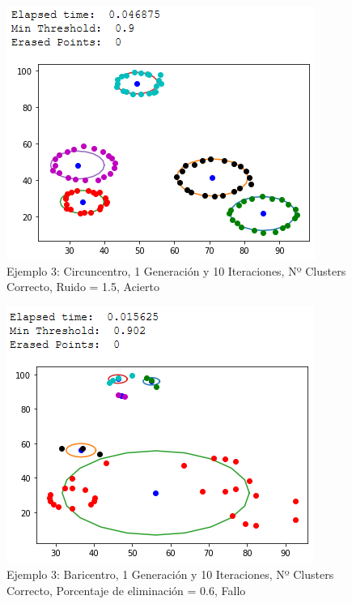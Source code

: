 \documentclass[conference,a4paper]{IEEEtran}
\begin{document}
\begin{figure}[H]
\centering
\includegraphics[scale=0.65]{Experimentacion/Ejemplo3/ej3_c_1_10_lr}
\caption{Ejemplo 3: Circuncentro, 1 Generación y 10 Iteraciones,  Nº Clusters Correcto, Ruido = 1.5, Acierto\\}
\end{figure}

\begin{figure}[H]
\centering
\includegraphics[scale=0.65]{Experimentacion/Ejemplo3/ej3_b_1_10_me}
\caption{Ejemplo 3: Baricentro, 1 Generación y 10 Iteraciones,  Nº Clusters Correcto, Porcentaje de eliminación = 0.6, Fallo\\}
\end{figure}
\end{document}

